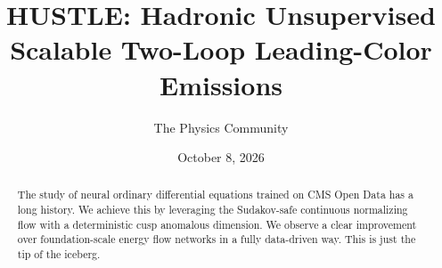 \documentclass[11pt]{article}
\title{HUSTLE: Hadronic Unsupervised Scalable Two-Loop Leading-Color Emissions}
\author{The Physics Community}
\date{October 8, 2026}
\numberwithin{equation}{section}
\theoremstyle{definition}
\theoremstyle{remark}
\begin{document}
\maketitle
\begin{abstract}
The study of neural ordinary differential equations trained on CMS Open
Data has a long history. We achieve this by leveraging the Sudakov-safe
continuous normalizing flow with a deterministic cusp anomalous
dimension. We observe a clear improvement over foundation-scale energy
flow networks in a fully data-driven way. This is just the tip of the
iceberg.
\end{abstract}
\tableofcontents



\nocite{*}


\end{document}
